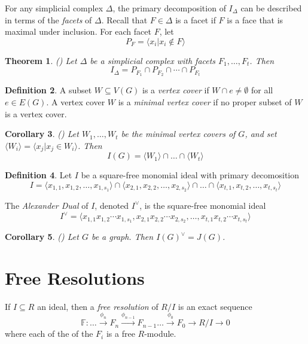 \documentclass[paper=a4, fontsize=11pt]{scrartcl} %
\theoremstyle{plain}
\newtheorem{thm}{Theorem}[section]
\newtheorem{cor}[thm]{Corollary}
\theoremstyle{definition}
\newtheorem{defn}[thm]{Definition}
\begin{document}
For any simplicial complex $\Delta$, the primary decomposition of $I_{\Delta}$ can be described in terms of the \textit{facets} of $\Delta$. Recall that $F \in \Delta$ is a facet if $F$ is a face that is maximal under inclusion. For each facet $F$, let $$P_{F} = \langle x_i \vert x_i \notin F \rangle$$

\begin{thm} (\cite[Theorem 3.1.34]{Mo12}) Let $\Delta$ be a simplicial complex with facets $F_1, \dots, F_t$. Then $$I_{\Delta} = P_{F_1} \cap P_{F_2} \cap \cdots \cap P_{F_t}$$
\end{thm}

\begin{defn} A subset $W \subseteq V(G)$ is a \textit{vertex cover} if $W \cap e \neq \emptyset$ for all $e \in E(G)$. A vertex cover $W$ is a \textit{minimal vertex cover} if no proper subset of $W$ is a vertex cover.
\end{defn}

\begin{cor} (\cite[Corollary 3.1.35]{Mo12})
Let $W_1, \dots, W_t$ be the minimal vertex covers of $G$, and set $\langle W_i \rangle = \langle x_j \vert x_j \in W_i \rangle$. Then
$$I(G) = \langle W_1 \rangle \cap \dots \cap \langle W_t \rangle$$
\end{cor}

\begin{defn}
Let $I$ be a square-free monomial ideal with primary decomosition $$I = \langle x_{1,1}, x_{1,2}, \dots, x_{1,s_1} \rangle \cap \langle x_{2,1}, x_{2,2}, \dots, x_{2,s_2} \rangle \cap \dots \cap \langle x_{t,1}, x_{t,2}, \dots, x_{t,s_t} \rangle$$

The \textit{Alexander Dual} of $I$, denoted $I^{\vee}$, is the square-free monomial ideal $$I^{\vee} = \langle x_{1,1} x_{1,2} \cdots x_{1,s_1}, x_{2,1} x_{2,2} \cdots x_{2,s_2}, \dots, x_{t,1} x_{t,2} \cdots x_{t,s_t} \rangle$$
\end{defn}

\begin{cor} (\cite[Corollary 3.1.38]{Mo12})
Let $G$ be a graph. Then $I(G)^{\vee} = J(G)$.
\end{cor}

\section{Free Resolutions}
If $I \subseteq R$ an ideal, then a \textit{free resolution} of $R/I$ is an exact sequence $$\mathbb{F} : \dots \xrightarrow{\phi_{n}} F_n \xrightarrow{\phi_{n-1}} F_{n-1} \dots \xrightarrow{\phi_{0}} F_0 \rightarrow R/I \rightarrow 0$$ where each of the of the $F_i$ is a free $R$-module.
\end{document}
